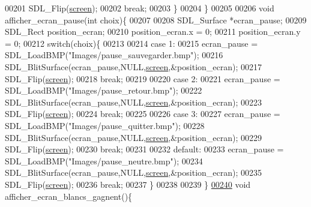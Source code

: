 \begin{DoxyCode}
00201                 SDL\_Flip(\hyperlink{fonction_interface_8h_a78fa3957d73de49cb81d047857504218}{screen});
00202                 \textcolor{keywordflow}{break};
00203         \}
00204 \}
00205 
00206 \textcolor{keywordtype}{void} afficher\_ecran\_pause(\textcolor{keywordtype}{int} choix)\{
00207 
00208         SDL\_Surface *ecran\_pause;
00209         SDL\_Rect position\_ecran;
00210         position\_ecran.x = 0;
00211         position\_ecran.y = 0;
00212         \textcolor{keywordflow}{switch}(choix)\{
00213 
00214         \textcolor{keywordflow}{case} 1:
00215                 ecran\_pause = SDL\_LoadBMP(\textcolor{stringliteral}{"Images/pause\_sauvegarder.bmp"});
00216                 SDL\_BlitSurface(ecran\_pause,NULL,\hyperlink{fonction_interface_8h_a78fa3957d73de49cb81d047857504218}{screen},&position\_ecran);
00217                 SDL\_Flip(\hyperlink{fonction_interface_8h_a78fa3957d73de49cb81d047857504218}{screen});
00218                 \textcolor{keywordflow}{break};
00219 
00220         \textcolor{keywordflow}{case} 2:
00221                 ecran\_pause = SDL\_LoadBMP(\textcolor{stringliteral}{"Images/pause\_retour.bmp"});
00222                 SDL\_BlitSurface(ecran\_pause,NULL,\hyperlink{fonction_interface_8h_a78fa3957d73de49cb81d047857504218}{screen},&position\_ecran);
00223                 SDL\_Flip(\hyperlink{fonction_interface_8h_a78fa3957d73de49cb81d047857504218}{screen});
00224                 \textcolor{keywordflow}{break};
00225 
00226         \textcolor{keywordflow}{case} 3:
00227                 ecran\_pause = SDL\_LoadBMP(\textcolor{stringliteral}{"Images/pause\_quitter.bmp"});
00228                 SDL\_BlitSurface(ecran\_pause,NULL,\hyperlink{fonction_interface_8h_a78fa3957d73de49cb81d047857504218}{screen},&position\_ecran);
00229                 SDL\_Flip(\hyperlink{fonction_interface_8h_a78fa3957d73de49cb81d047857504218}{screen});
00230                 \textcolor{keywordflow}{break};
00231 
00232         \textcolor{keywordflow}{default}:
00233                 ecran\_pause = SDL\_LoadBMP(\textcolor{stringliteral}{"Images/pause\_neutre.bmp"});
00234                 SDL\_BlitSurface(ecran\_pause,NULL,\hyperlink{fonction_interface_8h_a78fa3957d73de49cb81d047857504218}{screen},&position\_ecran);
00235                 SDL\_Flip(\hyperlink{fonction_interface_8h_a78fa3957d73de49cb81d047857504218}{screen});
00236                 \textcolor{keywordflow}{break};
00237         \}
00238 
00239 \}
\hypertarget{fonction_interface_8c_source_l00240}{}\hyperlink{fonction_interface_8h_acc462fb032b8caf056324a003ae36497}{00240} \textcolor{keywordtype}{void} afficher\_ecran\_blancs\_gagnent()\{

\end{DoxyCode}
